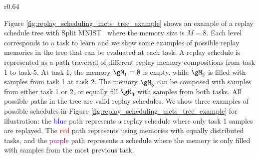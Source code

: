 \begin{wrapfigure}{r}{0.64\textwidth}
	\centering
	\setlength{\figwidth}{.64\textwidth}
	\setlength{\figheight}{.27\textheight}
	\vspace{-3mm}
	
	\vspace{-5mm}
    \caption{Tree-shaped action space of possible replay memories of size $M=8$ at every task for Split MNIST.
	}
	\vspace{-3mm}
	\label{fig:replay_scheduling_mcts_tree_example}
\end{wrapfigure}
Figure \ref{fig:replay_scheduling_mcts_tree_example} shows an example of a replay schedule tree with Split MNIST~ 
where the memory size is $M=8$. Each level corresponds to a task to learn and we show some examples of possible replay memories in the tree that can be evaluated at each task. A replay schedule is represented as a path traversal of different replay memory compositions from task 1 to task 5. At task 1, the memory $\gM_1 = \emptyset$ is empty, while $\gM_2$ is filled with samples from task 1 at task 2. The memory $\gM_3$ can be composed with samples from either task 1 or 2, or equally fill $\gM_3$ with samples from both tasks. All possible paths in the tree are valid replay schedules. We show three examples of possible schedules in Figure \ref{fig:replay_scheduling_mcts_tree_example} for illustration: the \textcolor{blue}{blue} path represents a replay schedule where only task 1 samples are replayed. The \textcolor{red}{red} path represents using memories with equally distributed tasks, and the \textcolor{purple}{purple} path represents a schedule where the memory is only filled with samples from the most previous task.



